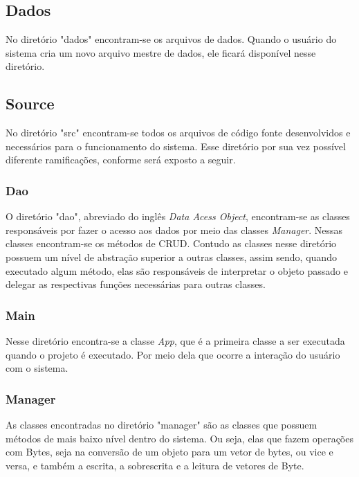 \subsection{\esp Dados}

No diretório "dados" encontram-se os arquivos de dados. Quando o usuário do sistema cria um novo arquivo mestre de dados, ele ficará disponível nesse diretório.

\subsection{\esp Source}

No diretório "src" encontram-se todos os arquivos de código fonte desenvolvidos e necessários para o funcionamento do sistema. Esse diretório por sua vez possível diferente ramificações, conforme será exposto a seguir.

\subsubsection{\esp Dao}

O diretório "dao", abreviado do inglês \textit{Data Acess Object}, encontram-se as classes responsáveis por fazer o acesso aos dados por meio das classes \textit{Manager}. Nessas classes encontram-se os métodos de CRUD. Contudo as classes nesse diretório possuem um nível de abstração superior a outras classes, assim sendo, quando executado algum método, elas são responsáveis de interpretar o objeto passado e delegar as respectivas funções necessárias para outras classes.

\subsubsection{\esp Main}

Nesse diretório encontra-se a classe \textit{App}, que é a primeira classe a ser executada quando o projeto é executado. Por meio dela que ocorre a interação do usuário com o sistema.

\subsubsection{\esp Manager}
 
As classes encontradas no diretório "manager" são as classes que possuem métodos de mais baixo nível dentro do sistema. Ou seja, elas que fazem operações com Bytes, seja na conversão de um objeto para um vetor de bytes, ou vice e versa, e também a escrita, a sobrescrita e a leitura de vetores de Byte. 

